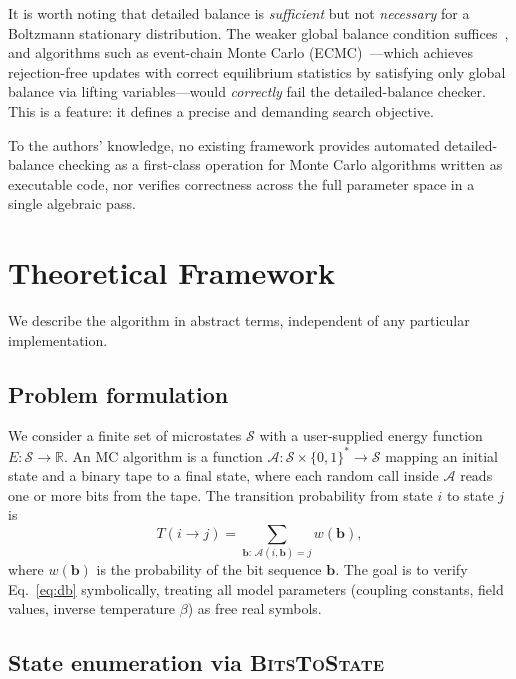 \documentclass[twocolumn,10pt]{article}
\begin{document}
It is worth noting that detailed balance is \emph{sufficient} but not
\emph{necessary} for a Boltzmann stationary distribution.  The weaker global
balance condition suffices~\cite{Manousiouthakis1999}, and algorithms such as
event-chain Monte Carlo (ECMC)~\cite{Bernard2009}---which achieves
rejection-free updates with correct equilibrium statistics by satisfying
only global balance via lifting variables---would \emph{correctly} fail the
detailed-balance checker.  This is a feature: it defines a precise and
demanding search objective.

To the authors' knowledge, no existing framework provides automated
detailed-balance checking as a first-class operation for Monte Carlo
algorithms written as executable code, nor verifies correctness across the
full parameter space in a single algebraic pass.

\section{Theoretical Framework}
\label{sec:method}

We describe the algorithm in abstract terms, independent of any particular
implementation.

\subsection{Problem formulation}

We consider a finite set of microstates $\mathcal{S}$ with a user-supplied
energy function $E:\mathcal{S}\to\mathbb{R}$.  An MC algorithm is a
function $\mathcal{A}:\mathcal{S}\times\{0,1\}^\ast\to\mathcal{S}$ mapping
an initial state and a binary tape to a final state, where each random call
inside $\mathcal{A}$ reads one or more bits from the tape.  The transition
probability from state $i$ to state $j$ is
\begin{equation}
  T(i\to j) = \sum_{\mathbf{b}:\,\mathcal{A}(i,\mathbf{b})=j} w(\mathbf{b}),
\end{equation}
where $w(\mathbf{b})$ is the probability of the bit sequence $\mathbf{b}$.
The goal is to verify Eq.~\eqref{eq:db} symbolically, treating all model
parameters (coupling constants, field values, inverse temperature $\beta$) as
free real symbols.

\subsection{State enumeration via \textsc{BitsToState}}
\label{sec:bitstostate}
\end{document}
